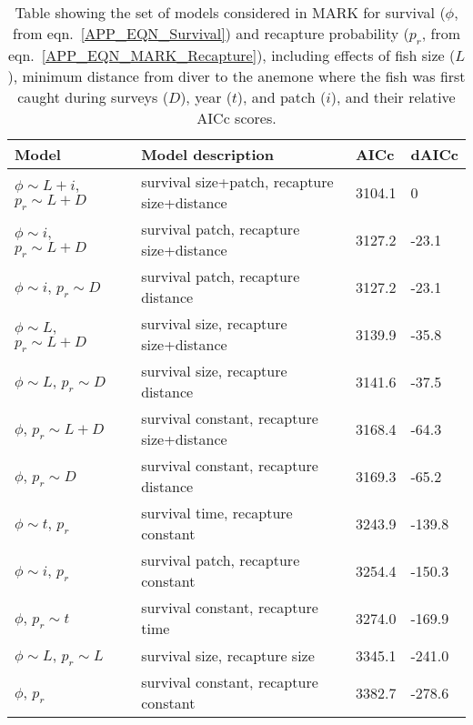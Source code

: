 \documentclass[12pt, oneside]{article}   	%
\begin{document}
\begin{table}[!htbp]
\begin{centering}
\caption{Table showing the set of models considered in MARK for survival ($\phi$, from eqn.\ \ref{APP_EQN_Survival}) and recapture probability ($p_r$, from eqn.\ \ref{APP_EQN_MARK_Recapture}), including effects of fish size ($L$), minimum distance from diver to the anemone where the fish was first caught during surveys ($D$), year ($t$), and patch ($i$), and their relative AICc scores.}\label{APP_TAB_MARKmodels}
\begin{tabular}{|p{1.75in}|p{2.75in}|p{0.75in}|p{0.75in}|}
\hline 
\textbf{Model} & \textbf{Model description} & \textbf{AICc} & \textbf{dAICc} \\ \hline
$\phi \sim L+i$, $p_r \sim L+D$ & survival size+patch, recapture size+distance & 3104.1 & 0 \\ \hline
$\phi \sim i$, $p_r \sim L+D$ & survival patch, recapture size+distance & 3127.2 & -23.1 \\ \hline
$\phi \sim i$, $p_r \sim D$ & survival patch, recapture distance & 3127.2 & -23.1 \\ \hline
$\phi \sim L$, $p_r \sim L+D$ & survival size, recapture size+distance & 3139.9 & -35.8 \\ \hline
$\phi \sim L$, $p_r \sim D$ & survival size, recapture distance & 3141.6 & -37.5 \\ \hline
$\phi$, $p_r \sim L+D$ & survival constant, recapture size+distance & 3168.4 & -64.3 \\ \hline
$\phi$, $p_r \sim D$ & survival constant, recapture distance & 3169.3 & -65.2 \\ \hline
$\phi \sim t$, $p_r$ & survival time, recapture constant & 3243.9 & -139.8 \\ \hline
$\phi \sim i$, $p_r$ & survival patch, recapture constant & 3254.4 & -150.3 \\ \hline
$\phi$, $p_r \sim t$ & survival constant, recapture time & 3274.0 & -169.9 \\ \hline
$\phi \sim L$, $p_r \sim L$ & survival size, recapture size & 3345.1 & -241.0 \\ \hline
$\phi$, $p_r$ & survival constant, recapture constant & 3382.7 & -278.6 \\ \hline
\end{tabular}
\end{centering}
\end{table}
\end{document}
